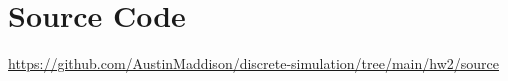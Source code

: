 \documentclass[twocolumn]{article}
\begin{document}
\section*{Source Code}
\href{https://github.com/AustinMaddison/discrete-simulation/tree/main/hw2/source}{https://github.com/AustinMaddison/discrete-simulation/tree/main/hw2/source}

%
%
\end{document}
